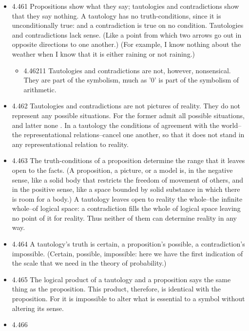 \documentclass[11pt]{article}
\begin{document}
\begin{itemize}
\item 4.461
\label{sec:org7ed19b2}
Propositions show what they say; tautologies and contradictions show
that they say nothing. A tautology has no truth-conditions, since it is
unconditionally true: and a contradiction is true on no condition.
Tautologies and contradictions lack sense. (Like a point from which two
arrows go out in opposite directions to one another.) (For example, I know
nothing about the weather when I know that it is either raining or not
raining.)
\begin{itemize}
\item 4.46211
\label{sec:orgd490cac}
Tautologies and contradictions are not, however, nonsensical. They
are part of the symbolism, much as '0' is part of the symbolism of
arithmetic.
\end{itemize}
\item 4.462
\label{sec:orgaf74776}
Tautologies and contradictions are not pictures of reality. They do
not represent any possible situations. For the former admit all possible
situations, and latter none . In a tautology the conditions of agreement
with the world--the representational relations--cancel one another, so that
it does not stand in any representational relation to reality.
\item 4.463
\label{sec:org2792f56}
The truth-conditions of a proposition determine the range that it
leaves open to the facts. (A proposition, a picture, or a model is, in the
negative sense, like a solid body that restricts the freedom of movement of
others, and in the positive sense, like a space bounded by solid substance
in which there is room for a body.) A tautology leaves open to reality the
whole--the infinite whole--of logical space: a contradiction fills the
whole of logical space leaving no point of it for reality. Thus neither of
them can determine reality in any way.
\item 4.464
\label{sec:org8487757}
A tautology's truth is certain, a proposition's possible, a
contradiction's impossible. (Certain, possible, impossible: here we have
the first indication of the scale that we need in the theory of
probability.)
\item 4.465
\label{sec:org9ee5e97}
The logical product of a tautology and a proposition says the same
thing as the proposition. This product, therefore, is identical with the
proposition. For it is impossible to alter what is essential to a symbol
without altering its sense.
\item 4.466

\end{itemize}
\end{document}
